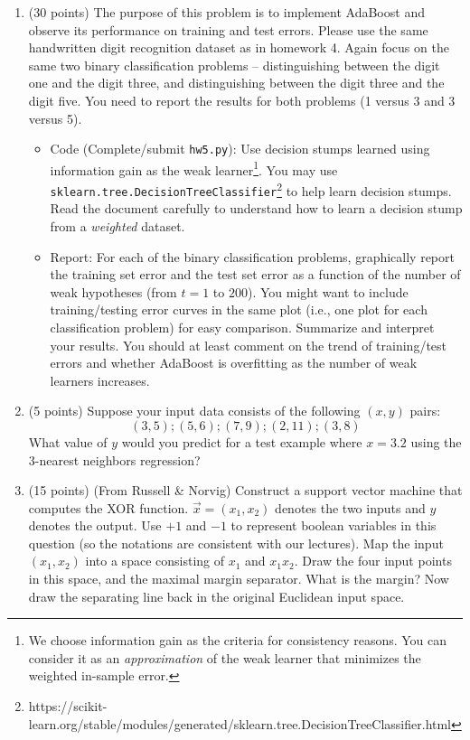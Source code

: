 \documentclass[11pt]{article}
\begin{document}
\begin{enumerate}


\item (30 points) The purpose of this problem is to implement AdaBoost and observe its performance on training and test errors. 
Please use the same handwritten digit recognition dataset as in homework 4. 
Again focus on the same two binary classification problems -- distinguishing between the digit one and the digit three, and distinguishing between the digit three and the digit five. You need to report the results for both problems (1 versus 3 and 3 versus 5).

\begin{itemize}
    \item Code (Complete/submit \texttt{hw5.py}):
    Use decision stumps learned using information gain as the weak learner\footnote{We choose information gain as the criteria for consistency reasons. You can consider it as an \emph{approximation} of the weak learner that minimizes the weighted in-sample error.}. 
    You may use \texttt{sklearn.tree.DecisionTreeClassifier}\footnote{https://scikit-learn.org/stable/modules/generated/sklearn.tree.DecisionTreeClassifier.html} to help learn decision stumps. 
    Read the document carefully to understand how to learn a decision stump from a \emph{weighted} dataset.
    \item Report:
    For each of the binary classification problems, graphically report the training set error and the test set error as a function of the number of weak hypotheses (from $t=1$ to $200$). You might want to include training/testing error curves in the same plot (i.e., one plot for each classification problem) for easy comparison. Summarize and interpret your results. You should at least comment on the trend of training/test errors and whether AdaBoost is overfitting as the number of weak learners increases.
\end{itemize}


\item (5 points)
Suppose your input data consists of the following $(x, y)$ pairs:
\[
(3, 5); (5, 6); (7, 9); (2, 11); (3, 8)
\]
What value of $y$ would you predict for a test example where $x = 3.2$ 
using the 3-nearest neighbors regression?


\item (15 points) (From Russell \& Norvig)
Construct a support vector machine that computes the XOR function. 
$\vec{x} = (x_1,x_2)$ denotes the two inputs and $y$ denotes the output. 
Use $+1$ and $-1$ to represent boolean variables in this question (so the notations are consistent with our lectures).
Map the input $(x_1, x_2)$ into a space consisting of $x_1$ and $x_1 x_2$. 
Draw the four input points in this space, and the maximal margin separator. 
What is the margin? Now draw the separating line back in the original Euclidean input space.


\end{enumerate}
\end{document}
